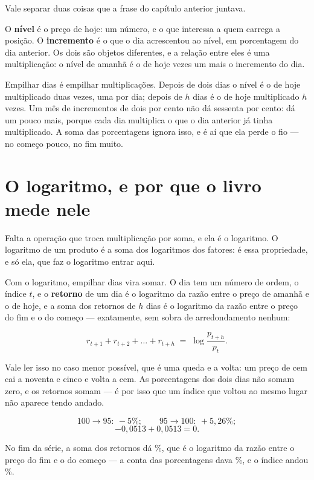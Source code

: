 Vale separar duas coisas que a frase do capítulo anterior juntava.

O \textbf{nível} é o preço de hoje: um número, e o que interessa a quem carrega a posição. O
\textbf{incremento} é o que o dia acrescentou ao nível, em porcentagem do dia anterior. Os dois
são objetos diferentes, e a relação entre eles é uma multiplicação: o nível de amanhã é o de
hoje vezes um mais o incremento do dia.

Empilhar dias é empilhar multiplicações. Depois de dois dias o nível é o de hoje multiplicado
duas vezes, uma por dia; depois de $h$ dias é o de hoje multiplicado $h$ vezes. Um mês de
incrementos de dois por cento não dá sessenta por cento: dá um pouco mais, porque cada dia
multiplica o que o dia anterior já tinha multiplicado. A soma das porcentagens ignora isso, e é
aí que ela perde o fio --- no começo pouco, no fim muito.

\section{O logaritmo, e por que o livro mede nele}

Falta a operação que troca multiplicação por soma, e ela é o logaritmo. O logaritmo de um
produto é a soma dos logaritmos dos fatores: é essa propriedade, e só ela, que faz o logaritmo
entrar aqui.

Com o logaritmo, empilhar dias vira somar. O dia tem um número de ordem, o índice $t$, e o
\textbf{retorno} de um dia é o logaritmo da razão
entre o preço de amanhã e o de hoje, e a soma dos retornos de $h$ dias é o logaritmo da razão
entre o preço do fim e o do começo --- exatamente, sem sobra de arredondamento nenhum:

\[
  r_{t+1} + r_{t+2} + \dots + r_{t+h} \;=\; \log \frac{p_{t+h}}{p_t}.
\]

Vale ler isso no caso menor possível, que é uma queda e a volta: um preço de cem cai a noventa
e cinco e volta a cem. As porcentagens dos dois dias não somam zero, e os retornos somam --- é
por isso que um índice que voltou ao mesmo lugar não aparece tendo andado.

\[ 100 \to 95:\ -5\% ; \qquad 95 \to 100:\ +5{,}26\% ; \]
\[ -0{,}0513 + 0{,}0513 = 0 . \]

No fim da série, a soma
dos retornos dá \numSomaLogsPct\%, que é o logaritmo da razão entre o preço do fim e o do
começo --- a conta das porcentagens dava \numSomaVariacoesPct\%, e o índice andou
\numSomaVariacaoRealPct\%.

